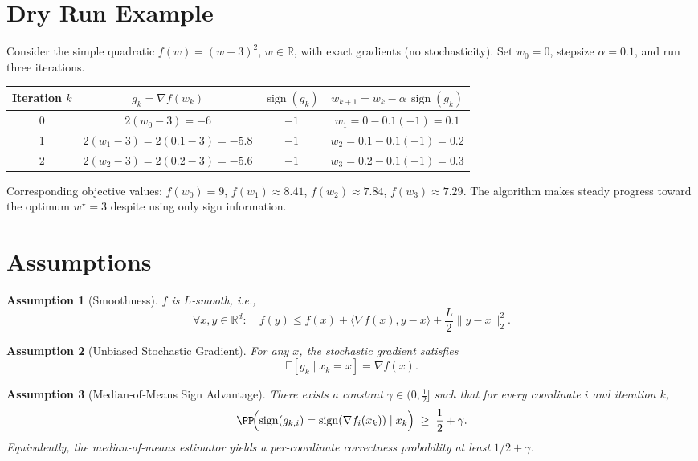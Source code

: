 \documentclass{article}
\newtheorem{assumption}{Assumption}
\newcommand{\sign}{\operatorname{sign}}
\newcommand{\EE}{\mathbb{E}}
\newcommand{\RR}{\mathbb{R}}
\begin{document}
\section*{Dry Run Example}
Consider the simple quadratic $f(w)=(w-3)^{2}$, $w\in\RR$, with exact gradients (no stochasticity).  
Set $w_{0}=0$, stepsize $\alpha=0.1$, and run three iterations.

\begin{center}
\begin{tabular}{c|c|c|c}
Iteration $k$ & $g_{k}=\nabla f(w_{k})$ & $\sign(g_{k})$ & $w_{k+1}=w_{k}-\alpha\,\sign(g_{k})$ \\ \hline
0 & $2(w_{0}-3)=-6$ & $-1$ & $w_{1}=0-0.1(-1)=0.1$ \\[2pt]
1 & $2(w_{1}-3)=2(0.1-3)=-5.8$ & $-1$ & $w_{2}=0.1-0.1(-1)=0.2$ \\[2pt]
2 & $2(w_{2}-3)=2(0.2-3)=-5.6$ & $-1$ & $w_{3}=0.2-0.1(-1)=0.3$
\end{tabular}
\end{center}
Corresponding objective values: $f(w_{0})=9$, $f(w_{1})\approx8.41$, $f(w_{2})\approx7.84$, $f(w_{3})\approx7.29$.
The algorithm makes steady progress toward the optimum $w^{\star}=3$ despite using only sign information.

\newpage
\section*{Assumptions}
\begin{assumption}[Smoothness]\label{ass:smooth}
$f$ is $L$‑smooth, i.e.,
\[
\forall x,y\in\RR^{d}:\quad f(y)\le f(x)+\langle\nabla f(x),y-x\rangle+\frac{L}{2}\|y-x\|_{2}^{2}.
\]
\end{assumption}

\begin{assumption}[Unbiased Stochastic Gradient]\label{ass:unbiased}
For any $x$, the stochastic gradient satisfies
\[
\EE\!\left[g_{k}\mid x_{k}=x\right]=\nabla f(x).
\]
\end{assumption}

\begin{assumption}[Median‑of‑Means Sign Advantage]\label{ass:advantage}
There exists a constant $\gamma\in(0,\tfrac12]$ such that for every coordinate $i$ and iteration $k$,
\[
\PP\!\Bigl(\sign(g_{k,i})=\sign(\nabla f_{i}(x_{k}))\mid x_{k}\Bigr)\;\ge\;\frac12+\gamma .
\]
Equivalently, the median‑of‑means estimator yields a per‑coordinate correctness probability at least $1/2+\gamma$.
\end{assumption}
\end{document}
